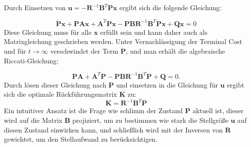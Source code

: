 Durch Einsetzen von $\mathbf{u} = \mathbf{-R}^{-1}\mathbf{B}^{T}\mathbf{Px}$ ergibt sich die folgende Gleichung:

\begin{equation}
\dot{\mathbf{P}}\mathbf{x} + \mathbf{P}\mathbf{Ax} + \mathbf{A}^{T}\mathbf{Px} - \mathbf{P}\mathbf{B}\mathbf{R}^{-1}\mathbf{B}^{T}\mathbf{Px} + \mathbf{Q}\mathbf{x} = 0
\end{equation}
Diese Gleichung muss für alle $\mathbf{x}$ erfüllt sein und kann daher auch als Matrixgleichung geschrieben werden. Unter Vernachlässigung der Terminal Cost und für $t \to \infty$ verschwindet der Term $\dot{\mathbf{P}}$, und man erhält die algebraische Riccati-Gleichung:

\begin{equation}
\mathbf{PA} + \mathbf{A}^{T}\mathbf{P} - \mathbf{P}\mathbf{B}\mathbf{R}^{-1}\mathbf{B}^{T}\mathbf{P} + \mathbf{Q} = 0.
\end{equation}
Durch lösen dieser Gleichung nach $\mathbf{P}$ und einsetzen in die Gleichung für $\mathbf{u}$ ergibt sich die optimale Rückführungsmatrix $\mathbf{K}$ zu:
\begin{equation}
\mathbf{K} = \mathbf{R}^{-1}\mathbf{B}^{T}\mathbf{P}
\end{equation}
Ein intuitiver Ansatz ist die Frage wie schlimm der Zustand $\mathbf{P}$ aktuell ist, dieser wird auf die Matrix $\mathbf{B}$ projiziert, um zu bestimmen wie stark die Stellgröße $\mathbf{u}$ auf diesen Zustand einwirken kann, und schließlich wird mit der Inversen von $\mathbf{R}$ gewichtet, um den Stellaufwand zu berücksichtigen.
\parencite{DataDrivenScience}





